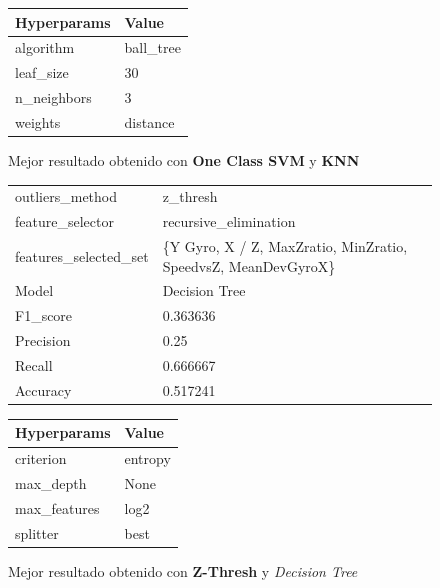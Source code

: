 \begin{appendices}
\begin{figure}[htb]
			\begin{tabular}{ll}
				\toprule
				Hyperparams &     Value \\
				\midrule
				  algorithm & ball\_tree \\
				  leaf\_size &        30 \\
				n\_neighbors &         3 \\
					weights &  distance \\
				\bottomrule
			\end{tabular}
			\caption{Mejor resultado obtenido con \textbf{One Class SVM} y \textbf{KNN}}
			\label{table:17}
		\end{figure}

		\begin{figure}[htb]
			\centering
			\begin{tabular}{ll}
				\toprule
					  outliers\_method &                                           z\_thresh \\
					 feature\_selector &                              recursive\_elimination \\
					 features\_selected\_set & \{Y Gyro, X / Z, MaxZratio, MinZratio, SpeedvsZ, MeanDevGyroX\} \\
								Model &                                      Decision Tree \\
						F1\_score &                                           0.363636 \\
					   Precision &                                               0.25 \\
						  Recall &                                           0.666667 \\
						Accuracy &                                           0.517241 \\
				\bottomrule
			\end{tabular}
			\newline
			\newline

			\begin{tabular}{ll}
			\toprule
			 Hyperparams &   Value \\
			\midrule
			   criterion & entropy \\
			   max\_depth &    None \\
			max\_features &    log2 \\
				splitter &    best \\
			\bottomrule
			\end{tabular}
			\caption{Mejor resultado obtenido con \textbf{Z-Thresh} y \emph{Decision Tree}}
			\label{table:18}
		\end{figure}


\end{appendices}
